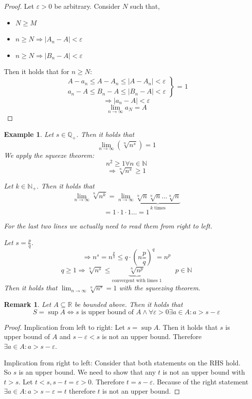 \documentclass[a4paper,landscape,twocolumn]{article}
\newtheorem{rem}{Remark}
\newtheorem{ex}{Example}
\newcommand\abs[1]{\left|#1\right|}
\begin{document}
\begin{proof}
  Let $\varepsilon > 0$ be arbitrary.
  Consider $N$ such that,
  \begin{itemize}
    \item $N \geq M$
    \item $n \geq N \Rightarrow \abs{A_n - A} < \varepsilon$
    \item $n \geq N \Rightarrow \abs{B_n - A} < \varepsilon$
  \end{itemize}
  Then it holds that for $n \geq N$:
  \[
    \left.\begin{array}{c}
      A - a_n \leq A - A_n \leq \abs{A - A_n} < \varepsilon \\
      a_n - A \leq B_n - A \leq \abs{B_n - A} < \varepsilon
    \end{array}\right\} \text{ = 1}
  \] \[
    \Rightarrow \abs{a_n - A} < \varepsilon
  \] \[
    \lim_{n \to \infty} a_N = A
  \]
\end{proof}

\begin{ex}
  Let $s \in \mathbb Q_+$. Then it holds that
  \[ \lim_{n \to \infty} \left(\sqrt[n]{n^s}\right) = 1 \]
  We apply the squeeze theorem:
  \[ n^2 \geq 1 \forall n \in \mathbb N \]
  \[ \Rightarrow \sqrt[n]{n^s} \geq 1 \]

  Let $k \in \mathbb N_+$. Then it holds that
  \[ \lim_{n \to \infty} \sqrt[n]{n^k} = \lim_{n \to \infty} \underbrace{\sqrt[n]{n} \sqrt[n]{n} \dots \sqrt[n]{n}}_{k \text { times}} \]
  \[ = 1 \cdot 1 \cdot 1 \dots = 1 \]

  For the last two lines we actually need to read them from right to left.

  Let $s = \frac pq$.
  \[ \Rightarrow n^s = n^{\frac pq} \leq q \cdot \left(n \frac{p}{q}\right)^q = n^p \]
  \[ q \geq 1 \Rightarrow \sqrt[n]{n^s}  \leq \underbrace{\sqrt[n]{n^p}}_{\text{convergent with limes }1} \qquad p \in \mathbb N \]
  Then it holds that $\lim_{n \to \infty} \sqrt[n]{n^s} = 1$ with the squeezing theorem.
\end{ex}

\begin{rem}
  Let $A \subseteq \mathbb R$ be bounded above. Then it holds that
  \[
      S = \sup{A}
      \Leftrightarrow
          s \text{ is upper bound of } A \land
          \forall \varepsilon > 0 \exists a \in A: a > s - \varepsilon
  \]
\end{rem}

\begin{proof}
  Implication from left to right:
  Let $s = \sup{A}$. Then it holds that $s$ is upper bound of $A$
  and $s - \varepsilon <  s$ is not an upper bound. Therefore $\exists a \in A: a > s - \varepsilon$.

  Implication from right to left:
  Consider that both statements on the RHS hold. So $s$ is an upper bound.
  We need to show that any $t$ is not an upper bound with $t > s$.
  Let $t < s, s - t = \varepsilon > 0$. Therefore $t = s - \varepsilon$.
  Because of the right statement $\exists a \in A: a > s - \varepsilon = t$ therefore $t$ is not an upper bound.
\end{proof}
\end{document}
